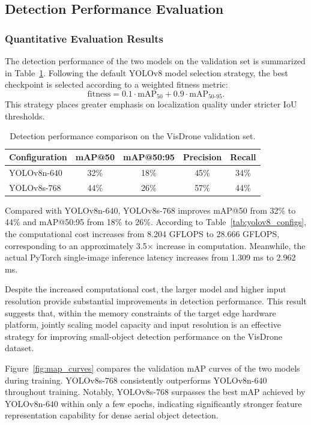 \subsection{Detection Performance Evaluation}

\subsubsection{Quantitative Evaluation Results}

The detection performance of the two models on the validation set is summarized in Table~\ref{tab:detection_results}. Following the default YOLOv8 model selection strategy, the best checkpoint is selected according to a weighted fitness metric:
\[
\mathrm{fitness} = 0.1 \cdot \mathrm{mAP}_{50} + 0.9 \cdot \mathrm{mAP}_{50\text{-}95}.
\]
This strategy places greater emphasis on localization quality under stricter IoU thresholds.

\begin{table}[h]
    \centering
    \caption{Detection performance comparison on the VisDrone validation set.}
    \label{tab:detection_results}
    \begin{tabular}{lcccc}
        \toprule
        Configuration & mAP@50 & mAP@50:95 & Precision & Recall \\
        \midrule
        YOLOv8n-$640$ & 32\% & 18\% & 45\% & 34\% \\
        YOLOv8s-$768$ & 44\% & 26\% & 57\% & 44\% \\
        \bottomrule
    \end{tabular}
\end{table}

Compared with YOLOv8n-$640$, YOLOv8s-$768$ improves mAP@50 from 32\% to 44\% and mAP@50:95 from 18\% to 26\%. According to Table~\ref{tab:yolov8_configs}, the computational cost increases from 8.204 GFLOPS to 28.666 GFLOPS, corresponding to an approximately 3.5$\times$ increase in computation. Meanwhile, the actual PyTorch single-image inference latency increases from 1.309 ms to 2.962 ms.

Despite the increased computational cost, the larger model and higher input resolution provide substantial improvements in detection performance. This result suggests that, within the memory constraints of the target edge hardware platform, jointly scaling model capacity and input resolution is an effective strategy for improving small-object detection performance on the VisDrone dataset.

Figure~\ref{fig:map_curves} compares the validation mAP curves of the two models during training. YOLOv8s-$768$ consistently outperforms YOLOv8n-$640$ throughout training. Notably, YOLOv8s-$768$ surpasses the best mAP achieved by YOLOv8n-$640$ within only a few epochs, indicating significantly stronger feature representation capability for dense aerial object detection.

